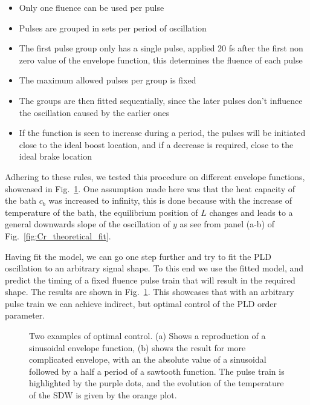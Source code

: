 \begin{itemize}
	\item Only one fluence can be used per pulse
	\item Pulses are grouped in sets per period of oscillation
	\item The first pulse group only has a single pulse, applied 20 fs after the first non zero value of the envelope function, this determines the fluence of each pulse
	\item The maximum allowed pulses per group is fixed
	\item The groups are then fitted sequentially, since the later pulses don't influence the oscillation caused by the earlier ones
	\item If the function is seen to increase during a period, the pulses will be initiated close to the ideal boost location, and if a decrease is required, close to the ideal brake location
\end{itemize}

Adhering to these rules, we tested this procedure on different envelope functions, showcased in Fig.~\ref{fig:Cr_control}.
One assumption made here was that the heat capacity of the bath $c_b$ was increased to infinity, this is done because with the increase of temperature of the bath, the equilibrium position of $L$ changes and leads to a general downwards slope of the oscillation of $y$ as see from panel (a-b) of Fig.~\ref{fig:Cr_theoretical_fit}.

Having fit the model, we can go one step further and try to fit the PLD oscillation to an arbitrary signal shape. To this end we use the fitted model, and predict the timing of a fixed fluence pulse train that will result in the required shape. The results are shown in Fig.~\ref{fig:Cr_control}. This showcases that with an arbitrary pulse train we can achieve indirect, but optimal control of the PLD order parameter.
\begin{figure}
	\caption{\label{fig:Cr_control} Two examples of optimal control. (a) Shows a reproduction of a sinusoidal envelope function, (b) shows the result for more complicated envelope, with an the absolute value of a sinusoidal followed by a half a period of a sawtooth function. The pulse train is highlighted by the purple dots, and the evolution of the temperature of the SDW is given by the orange plot.}
\end{figure}

\printbibliography

